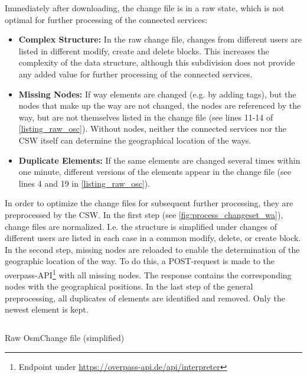 \documentclass[conference]{IEEEtran}
\begin{document}
Immediately after downloading, the change file is in a raw state, which is not optimal for further processing of the connected services:
\begin{itemize}
    \item \textbf{Complex Structure:} In the raw change file, changes from different users are listed in different modify, create and delete blocks. This increases the complexity of the data structure, although this subdivision does not provide any added value for further processing of the connected services.
    \item \textbf{Missing Nodes:} If way elements are changed (e.g. by adding tags), but the nodes that make up the way are not changed, the nodes are referenced by the way, but are not themselves listed in the change file (see lines 11-14 of \autoref{listing_raw_osc}). Without nodes, neither the connected services nor the CSW itself can determine the geographical location of the ways. 
    \item \textbf{Duplicate Elements:} If the same elements are changed several times within one minute, different versions of the elements appear in the change file (see lines 4 and 19 in \autoref{listing_raw_osc}).
\end{itemize}
In order to optimize the change files for subsequent further processing, they are preprocessed by the CSW. In the first step (see \autoref{fig:process_changeset_wa}), change files are normalized. I.e. the structure is simplified under changes of different users are listed in each case in a common modify, delete, or create block. In the second step, missing nodes are reloaded to enable the determination of the geographic location of the way. To do this, a POST-request is made to the overpass-API\footnote{Endpoint under \url{https://overpass-api.de/api/interpreter}} with all missing nodes. The response contains the corresponding nodes with the geographical positions. In the last step of the general preprocessing, all duplicates of elements are identified and removed. Only the newest element is kept.
\begin{listing}[h]
    \inputminted{xml}{listings/osmchange_raw.osc}
    \caption{Raw OsmChange file (simplified)}
    \label{listing_raw_osc}
\end{listing}
\end{document}
